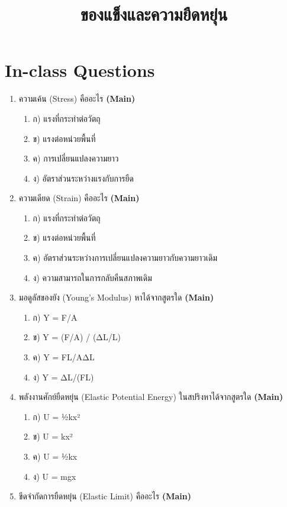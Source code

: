 \documentclass[12pt]{article}
\begin{document}
\title{ของแข็งและความยืดหยุ่น}
\maketitle
\section*{In-class Questions}
\begin{enumerate}[label=\arabic*.]
\item ความเค้น (Stress) คืออะไร \hfill \textbf{\small (Main)}
\begin{enumerate}[label=)]
\item ก) แรงที่กระทำต่อวัตถุ
\item ข) แรงต่อหน่วยพื้นที่
\item ค) การเปลี่ยนแปลงความยาว
\item ง) อัตราส่วนระหว่างแรงกับการยืด
\end{enumerate}
\item ความเดียด (Strain) คืออะไร \hfill \textbf{\small (Main)}
\begin{enumerate}[label=)]
\item ก) แรงที่กระทำต่อวัตถุ
\item ข) แรงต่อหน่วยพื้นที่
\item ค) อัตราส่วนระหว่างการเปลี่ยนแปลงความยาวกับความยาวเดิม
\item ง) ความสามารถในการกลับคืนสภาพเดิม
\end{enumerate}
\item มอดูลัสของยัง (Young's Modulus) หาได้จากสูตรใด \hfill \textbf{\small (Main)}
\begin{enumerate}[label=)]
\item ก) Y = F/A
\item ข) Y = (F/A) / (ΔL/L)
\item ค) Y = FL/AΔL
\item ง) Y = ΔL/(FL)
\end{enumerate}
\item พลังงานศักย์ยืดหยุ่น (Elastic Potential Energy) ในสปริงหาได้จากสูตรใด \hfill \textbf{\small (Main)}
\begin{enumerate}[label=)]
\item ก) U = ½kx²
\item ข) U = kx²
\item ค) U = ½kx
\item ง) U = mgx
\end{enumerate}
\item ขีดจำกัดการยืดหยุ่น (Elastic Limit) คืออะไร \hfill \textbf{\small (Main)}

\end{enumerate}
\end{document}
